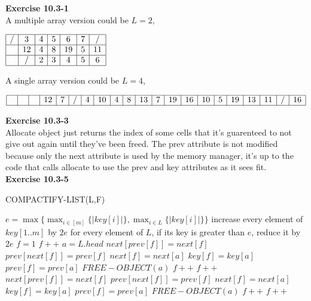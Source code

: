 \documentclass{article}
\begin{document}
\noindent\textbf{ Exercise 10.3-1} \\
A multiple array version could be $L=2$,

$
\begin{array}{|c|c|c|c|c|c|c|}
\hline
/&3&4&5&6&7&/\\

\hline
&12&4&8&19&5&11\\

\hline
&/&2&3&4&5&6\\

\hline
\end{array}
$

A single array version could be $L=4$,

$
\begin{array}{|c|c|c|c|c|c|c|c|c|c|c|c|c|c|c|c|c|c|c|c|c|}
\hline
\,\,&\,\,&\,\,&12&7&/&4&10&4&8&13&7&19&16&10&5&19&13&11&/&16\\
\hline
\end{array}
$


\noindent\textbf{ Exercise 10.3-3} \\
Allocate object just returns the index of some cells that it's guarenteed to not give out again until they've been freed. The prev attribute is not modified because only the next attribute is used by the memory manager, it's up to the code that calls allocate to use the prev and key attributes as it sees fit.\\


\noindent\textbf{ Exercise 10.3-5} \\


\begin{algorithm}
\caption{COMPACTIFY-LIST(L,F)}
\begin{algorithmic}
\State \Return
\EndIf
\State $e = \max\{ \max_{i\in[m]} \{|key[i]|\},\max_{i\in L}\{|key[i]|\}\}$
\State increase every element of $key[1..m]$ by $2e$
\State for every element of $L$, if its key is greater than $e$, reduce it by $2e$
\State $f = 1$
\State $f++$
\EndWhile
\State $a = L.head$
\State $next[prev[f]] = next[f]$
\State $prev[next[f]] = prev[f]$
\State $next[f] = next[a]$
\State $key[f] = key[a]$
\State $prev[f] = prev[a]$
\State $FREE-OBJECT(a)$
\State $f++$
\State $f++$
\EndWhile
\EndIf
{}
\State $next[prev[f]] = next[f]$
\State $prev[next[f]] = prev[f]$
\State $next[f] = next[a]$
\State $key[f] = key[a]$
\State $prev[f] = prev[a]$
\State $FREE-OBJECT(a)$
\State $f++$
\State $f++$
\EndWhile
\EndIf
\EndWhile
\end{algorithmic}
\end{algorithm}
\end{document}
